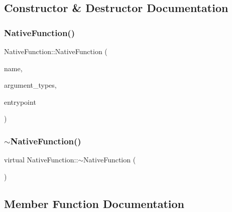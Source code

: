 \subsection{Constructor \& Destructor Documentation}
\mbox{\label{classNativeFunction_a189f9fd9161c741e533c3dc2c8396f31}} 
\subsubsection{\texorpdfstring{Native\+Function()}{NativeFunction()}}
{\footnotesize\ttfamily Native\+Function\+::\+Native\+Function (\begin{DoxyParamCaption}\item[{std\+::string}]{name,  }\item[{std\+::vector$<$ \hyperlink{classVarType}{Var\+Type} $>$}]{argument\+\_\+types,  }\item[{std\+::function$<$ void(std\+::vector$<$ \hyperlink{classValue}{Value} $>$, \hyperlink{classValue}{Value} $\ast$return\+\_\+value, std\+::shared\+\_\+ptr$<$ \hyperlink{classObject}{Object} $>$ object)$>$}]{entrypoint }\end{DoxyParamCaption})}

\mbox{\label{classNativeFunction_aa6055c6a092b8be8d1f9009efc6db0e0}} 
\subsubsection{\texorpdfstring{$\sim$\+Native\+Function()}{~NativeFunction()}}
{\footnotesize\ttfamily virtual Native\+Function\+::$\sim$\+Native\+Function (\begin{DoxyParamCaption}{ }\end{DoxyParamCaption})\hspace{0.3cm}{\ttfamily [virtual]}}



\subsection{Member Function Documentation}
\mbox{\label{classNativeFunction_a0f003d805cbc3625e311d1b2a1b861d9}} 
